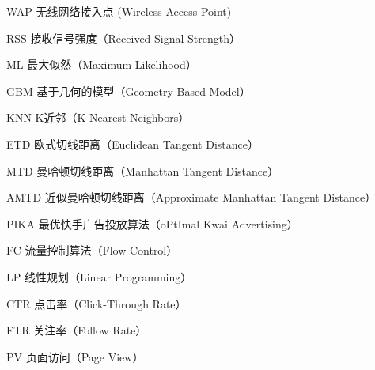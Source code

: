 \begin{denotation}[3cm]
\item[WAP] 无线网络接入点 (Wireless Access Point)
\item[RSS] 接收信号强度（Received Signal Strength）
\item[ML] 最大似然（Maximum Likelihood）
\item[GBM] 基于几何的模型（Geometry-Based Model）
\item[KNN] K近邻（K-Nearest Neighbors）
\item[ETD] 欧式切线距离（Euclidean Tangent Distance）
\item[MTD] 曼哈顿切线距离（Manhattan Tangent Distance）
\item[AMTD] 近似曼哈顿切线距离（Approximate Manhattan Tangent Distance）
\item[PIKA] 最优快手广告投放算法（oPtImal Kwai Advertising）
\item[FC] 流量控制算法（Flow Control）
\item[LP] 线性规划（Linear Programming）
\item[CTR] 点击率（Click-Through Rate）
\item[FTR] 关注率（Follow Rate）
\item[PV] 页面访问（Page View）
\end{denotation}
